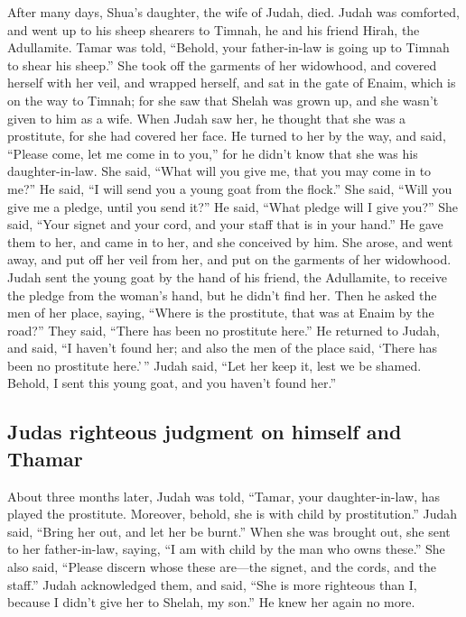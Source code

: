  After many days, Shua's daughter, the wife of Judah,
died. Judah was comforted, and went up to his sheep shearers to Timnah,
he and his friend Hirah, the Adullamite.  Tamar was told,
``Behold, your father-in-law is going up to Timnah to shear his sheep.''
 She took off the garments of her widowhood, and covered
herself with her veil, and wrapped herself, and sat in the gate of
Enaim, which is on the way to Timnah; for she saw that Shelah was grown
up, and she wasn't given to him as a wife.  When Judah
saw her, he thought that she was a prostitute, for she had covered her
face.  He turned to her by the way, and said, ``Please
come, let me come in to you,'' for he didn't know that she was his
daughter-in-law. She said, ``What will you give me, that you may come in
to me?''  He said, ``I will send you a young goat from
the flock.'' She said, ``Will you give me a pledge, until you send it?''
 He said, ``What pledge will I give you?'' She said,
``Your signet and your cord, and your staff that is in your hand.'' He
gave them to her, and came in to her, and she conceived by him.
 She arose, and went away, and put off her veil from her,
and put on the garments of her widowhood.  Judah sent the
young goat by the hand of his friend, the Adullamite, to receive the
pledge from the woman's hand, but he didn't find her. 
Then he asked the men of her place, saying, ``Where is the prostitute,
that was at Enaim by the road?'' They said, ``There has been no
prostitute here.''  He returned to Judah, and said, ``I
haven't found her; and also the men of the place said, `There has been
no prostitute here.'\,''  Judah said, ``Let her keep it,
lest we be shamed. Behold, I sent this young goat, and you haven't found
her.''

\hypertarget{judas-righteous-judgment-on-himself-and-thamar}{%
\subsection{Judas righteous judgment on himself and
Thamar}\label{judas-righteous-judgment-on-himself-and-thamar}}

 About three months later, Judah was told, ``Tamar, your
daughter-in-law, has played the prostitute. Moreover, behold, she is
with child by prostitution.'' Judah said, ``Bring her out, and let her
be burnt.''  When she was brought out, she sent to her
father-in-law, saying, ``I am with child by the man who owns these.''
She also said, ``Please discern whose these are---the signet, and the
cords, and the staff.''  Judah acknowledged them, and
said, ``She is more righteous than I, because I didn't give her to
Shelah, my son.'' He knew her again no more.


